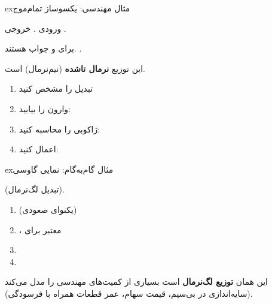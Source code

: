 \begin{PSbox}[unbreakable]{ex}{مثال مهندسی: یکسوساز تمام‌موج }

ورودی . خروجی .

برای  و  جواب هستند. .


این توزیع \textbf{نرمال تاشده} (نیم‌نرمال) است.

\end{PSbox}



\begin{enumerate}
\def\labelenumi{\arabic{enumi}.}
\tightlist
\item
  تبدیل  را مشخص کنید
\item
  وارون را بیابید: 
\item
  ژاکوبی را محاسبه کنید: 
\item
  اعمال کنید: 
\end{enumerate}

\begin{PSbox}[unbreakable]{ex}{مثال گام‌به‌گام: نمایی گاوسی}

 (تبدیل لگ‌نرمال).

\begin{enumerate}
\def\labelenumi{\arabic{enumi}.}
\tightlist
\item
   (یکنوای صعودی)
\item
  ، معتبر برای 
\item
\item
\end{enumerate}

این همان \textbf{توزیع لگ‌نرمال} است  بسیاری از کمیت‌های مهندسی را مدل می‌کند (سایه‌اندازی در بی‌سیم، قیمت سهام، عمر قطعات همراه با فرسودگی).

\end{PSbox}

